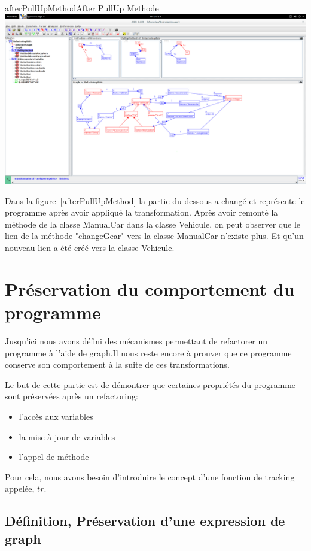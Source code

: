\documentclass[a4paper, 12pt]{article}
\begin{document}
  \begin{myfig}{afterPullUpMethod}{After PullUp Methode}
    \includegraphics[width=\textwidth]{afterPullUpMethod.png}
  \end{myfig}

  Dans la figure~\ref{afterPullUpMethod} la partie du dessous a changé et représente le programme après avoir appliqué la transformation.
  Après avoir remonté la méthode de la classe ManualCar dans la classe Vehicule,
  on peut observer que le lien de la méthode "changeGear" vers la classe ManualCar n'existe plus. Et qu'un nouveau lien a été créé vers la classe Vehicule.

  \section{Préservation du comportement du programme}

  Jusqu'ici nous avons défini des mécanismes permettant de refactorer un programme à l'aide de graph.Il nous reste encore à prouver que ce programme conserve son comportement à la suite de ces transformations.

  Le but de cette partie est de démontrer que certaines propriétés du programme sont préservées après un refactoring:
  \begin{itemize}[label=\textbullet]
    \item l'accès aux variables
    \item la mise à jour de variables
    \item l'appel de méthode
  \end{itemize}

  Pour cela, nous avons besoin d'introduire le concept d'une fonction de tracking appelée, \(tr\).

  \subsection{Définition, Préservation d'une expression de graph}
\end{document}
